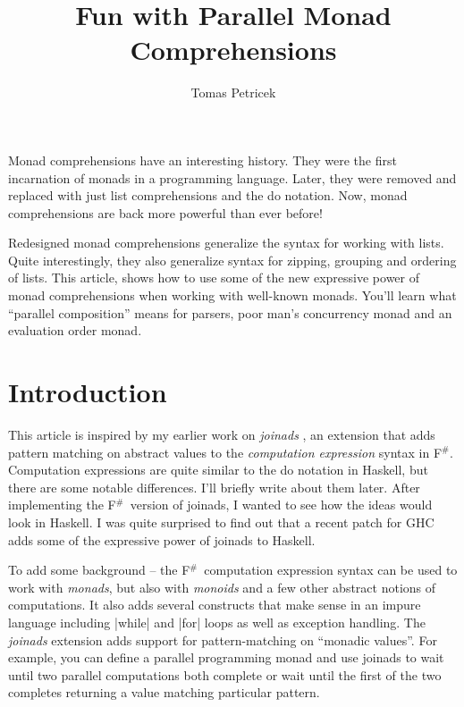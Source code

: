 \documentclass{tmr}
\title{Fun with Parallel Monad Comprehensions}
\author{Tomas Petricek\email{tomas.petricek@cl.cam.ac.uk}}
\begin{document}
\newcommand{\fsharp}[0]{F$^\#$}
\newcommand{\ident}[1]{{\normalfont\sffamily #1}}


\begin{introduction} 
Monad comprehensions have an interesting history. They were the first incarnation of monads in a 
programming language. Later, they were removed and replaced with just list comprehensions and 
the do notation. Now, monad comprehensions are back more powerful than ever before!

Redesigned monad comprehensions generalize the syntax for working with lists. Quite interestingly, 
they also generalize syntax for zipping, grouping and ordering of lists. This article, shows how to 
use some of the new expressive power of monad comprehensions when working with well-known monads. 
You'll learn what ``parallel composition'' means for parsers, poor man's concurrency
monad and an evaluation order monad.
\end{introduction}


\section{Introduction}

This article is inspired by my earlier work on \textit{joinads} \cite{joinads}, an extension that 
adds pattern matching on abstract values to the \textit{computation expression} syntax in \fsharp. 
Computation expressions are quite similar to the do notation in Haskell, but there are some notable 
differences. I'll briefly write about them later. After implementing the \fsharp \ version of 
joinads, I wanted to see how the ideas would look in Haskell. I was quite surprised to find out that 
a recent patch for GHC adds some of the expressive power of joinads to Haskell. 

To add some background -- the \fsharp \ computation expression syntax can be used to work with 
\textit{monads}, but also with \textit{monoids} and a few other abstract notions of computations. 
It also adds several constructs that make sense in an impure language including |while| and 
|for| loops as well as exception handling. The \textit{joinads} extension adds support for 
pattern-matching on ``monadic values''. For example, you can define a parallel programming monad
and use joinads to wait until two parallel computations both complete or wait until the first of 
the two completes returning a value matching particular pattern.
\end{document}
